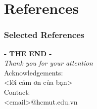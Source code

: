 \documentclass[aspectratio=169]{beamer}
\begin{document}

\section{References}
\begin{frame}
  \frametitle{Selected References}
  \nocite{*} %
  \printbibliography
\end{frame}

\begin{frame}
    \centering
    \vspace{1cm}
    \textbf{\Huge{- THE END - }}\\
    \vspace{0.2cm}
    \textit{\Large{Thank you for your attention}}\\
    \vspace{15pt}
    Acknowledgements:\\
    <lời cảm ơn của bạn>\\
    \vspace{20pt}
    Contact:\\
    <email>@hcmut.edu.vn
\end{frame}
\end{document}
